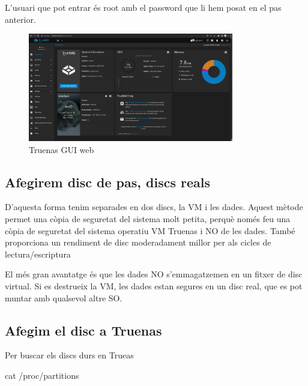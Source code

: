 \documentclass[
  10pt,
]{krantz}
\newenvironment{Shaded}{\begin{snugshade}}{\end{snugshade}}
\newcommand{\FunctionTok}[1]{\textcolor[rgb]{0.00,0.00,0.00}{#1}}
\newcommand{\NormalTok}[1]{#1}
\begin{document}
\begin{rmdinfo}{}
L'usuari que pot entrar és root amb el password que li hem posat en el pas anterior.

\end{rmdinfo}

\begin{figure}
\centering
\includegraphics[width=0.8\textwidth,height=\textheight]{imatges/proxmox/truena_ar2.png}
\caption{Truenas GUI web}
\end{figure}

\hypertarget{afegirem-disc-de-pas-discs-reals}{%
\subsection{Afegirem disc de pas, discs reals}\label{afegirem-disc-de-pas-discs-reals}}

D'aquesta forma tenim separades en dos discs, la VM i les dades. Aquest mètode permet una còpia de seguretat del sistema molt petita, perquè només feu una còpia de seguretat del sistema operatiu VM Truenas i NO de les dades. També proporciona un rendiment de disc moderadament millor per als cicles de lectura/escriptura

El més gran avantatge és que les dades NO s'emmagatzemen en un fitxer de disc virtual. Si es destrueix la VM, les dades estan segures en un disc real, que es pot muntar amb qualsevol altre SO.

\hypertarget{afegim-el-disc-a-truenas}{%
\subsection{Afegim el disc a Truenas}\label{afegim-el-disc-a-truenas}}

Per buscar els discs durs en Trueas

\begin{Shaded}
\begin{Highlighting}[]
\FunctionTok{cat}\NormalTok{ /proc/partitions}
\end{Highlighting}
\end{Shaded}
\end{document}

